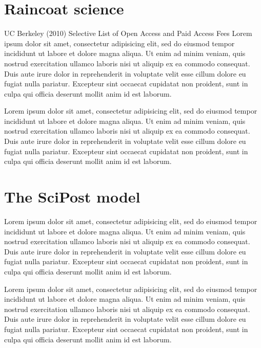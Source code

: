 \documentclass[11pt, openany, oneside, article, a4paper, twocolumn]{memoir}
\begin{document}
\section{Raincoat science}
UC Berkeley (2010) Selective List of Open Access and Paid Access Fees
Lorem ipsum dolor sit amet, consectetur adipisicing elit, sed do eiusmod tempor incididunt ut labore et dolore magna aliqua. Ut enim ad minim veniam, quis nostrud exercitation ullamco laboris nisi ut aliquip ex ea commodo consequat. Duis aute irure dolor in reprehenderit in voluptate velit esse cillum dolore eu fugiat nulla pariatur. Excepteur sint occaecat cupidatat non proident, sunt in culpa qui officia deserunt mollit anim id est laborum.

Lorem ipsum dolor sit amet, consectetur adipisicing elit, sed do eiusmod tempor incididunt ut labore et dolore magna aliqua. Ut enim ad minim veniam, quis nostrud exercitation ullamco laboris nisi ut aliquip ex ea commodo consequat. Duis aute irure dolor in reprehenderit in voluptate velit esse cillum dolore eu fugiat nulla pariatur. Excepteur sint occaecat cupidatat non proident, sunt in culpa qui officia deserunt mollit anim id est laborum.

\section{The SciPost model}
Lorem ipsum dolor sit amet, consectetur adipisicing elit, sed do eiusmod tempor incididunt ut labore et dolore magna aliqua. Ut enim ad minim veniam, quis nostrud exercitation ullamco laboris nisi ut aliquip ex ea commodo consequat. Duis aute irure dolor in reprehenderit in voluptate velit esse cillum dolore eu fugiat nulla pariatur. Excepteur sint occaecat cupidatat non proident, sunt in culpa qui officia deserunt mollit anim id est laborum.

Lorem ipsum dolor sit amet, consectetur adipisicing elit, sed do eiusmod tempor incididunt ut labore et dolore magna aliqua. Ut enim ad minim veniam, quis nostrud exercitation ullamco laboris nisi ut aliquip ex ea commodo consequat. Duis aute irure dolor in reprehenderit in voluptate velit esse cillum dolore eu fugiat nulla pariatur. Excepteur sint occaecat cupidatat non proident, sunt in culpa qui officia deserunt mollit anim id est laborum.

\printbibliography
\end{document}
